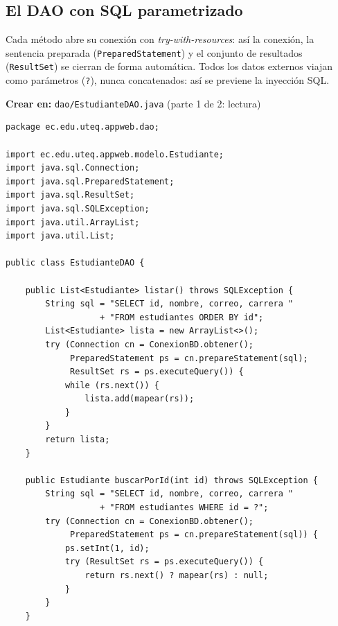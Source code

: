 \subsection{El DAO con SQL parametrizado}
\label{ap:crud:jsp:dao}

Cada método abre su conexión con \emph{try-with-resources}: así la
conexión, la sentencia preparada (\texttt{Prepared\-Statement}) y el
conjunto de resultados (\texttt{Result\-Set}) se cierran de forma
automática. Todos los datos externos viajan como parámetros
(\texttt{?}), nunca concatenados: así se previene la inyección SQL.

{\small\textbf{Crear en:} \texttt{dao/EstudianteDAO.java} (parte 1 de 2: lectura)}
\begin{lstlisting}[style=java,caption={EstudianteDAO.java --- parte 1: listar y buscar},label={lst:jsp-dao-a}]
package ec.edu.uteq.appweb.dao;

import ec.edu.uteq.appweb.modelo.Estudiante;
import java.sql.Connection;
import java.sql.PreparedStatement;
import java.sql.ResultSet;
import java.sql.SQLException;
import java.util.ArrayList;
import java.util.List;

public class EstudianteDAO {

    public List<Estudiante> listar() throws SQLException {
        String sql = "SELECT id, nombre, correo, carrera "
                   + "FROM estudiantes ORDER BY id";
        List<Estudiante> lista = new ArrayList<>();
        try (Connection cn = ConexionBD.obtener();
             PreparedStatement ps = cn.prepareStatement(sql);
             ResultSet rs = ps.executeQuery()) {
            while (rs.next()) {
                lista.add(mapear(rs));
            }
        }
        return lista;
    }

    public Estudiante buscarPorId(int id) throws SQLException {
        String sql = "SELECT id, nombre, correo, carrera "
                   + "FROM estudiantes WHERE id = ?";
        try (Connection cn = ConexionBD.obtener();
             PreparedStatement ps = cn.prepareStatement(sql)) {
            ps.setInt(1, id);
            try (ResultSet rs = ps.executeQuery()) {
                return rs.next() ? mapear(rs) : null;
            }
        }
    }
\end{lstlisting}

